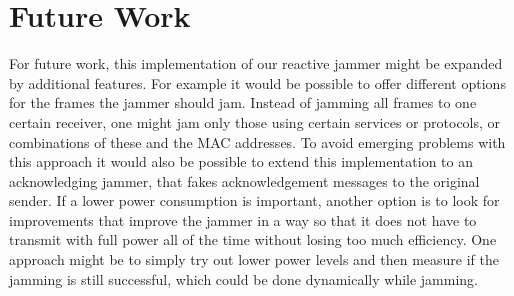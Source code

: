 \documentclass[sigconf]{acmart}
\begin{document}
\section{Future Work}
For future work, this implementation of our reactive jammer might be expanded by additional features. For example it would
be possible to offer different options for the frames the jammer should jam. Instead of jamming all frames to one certain
receiver, one might jam only those using certain services or protocols, or combinations of these and the MAC addresses.
To avoid emerging problems with this approach it would also be possible to extend this implementation to an acknowledging
jammer, that fakes acknowledgement messages to the original sender. If a lower power consumption is important, another
option is to look for improvements that improve the jammer in a way so that it does not have to transmit with full power all of
the time without losing too much efficiency. One approach might be to simply try out lower power levels and then measure if
the jamming is still successful, which could be done dynamically while jamming.



% 
\end{document}
